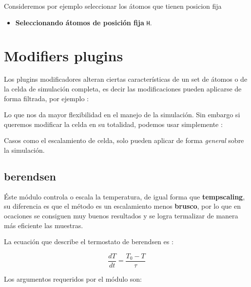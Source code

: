 Consideremos por ejemplo seleccionar los \'atomos que tienen posicion fija

\begin{itemize}
 \item \textbf{Seleccionando \'atomos de posici\'on fija} \texttt{H}.
\end{itemize}

\section{Modifiers plugins}

Los plugins modificadores alteran ciertas caracter\'isticas de un set de
\'atomos o de la celda de simulaci\'on completa, es decir las modificaciones
pueden aplicarse de forma filtrada, por ejemplo :


Lo que nos da mayor flexibilidad en el manejo de la simulaci\'on. Sin embargo si
queremos modificar la celda en su totalidad, podemos usar simplemente :


Casos como el escalamiento de celda, solo pueden aplicar de forma
\textit{general} sobre la simulaci\'on.

\subsection{berendsen}
\'Este m\'odulo controla o escala la temperatura, de igual forma que
\textbf{tempscaling}, su diferencia es que el m\'etodo es un escalamiento menos
\textbf{brusco}, por lo que en ocaciones se consiguen muy buenos resultados y se
logra termalizar de manera m\'as eficiente las muestras. 

La ecuaci\'on que describe el termostato de berendsen es :

$$\frac{dT}{dt} = \frac{T_0 - T}{\tau}$$

Los argumentos requeridos por el m\'odulo son:



